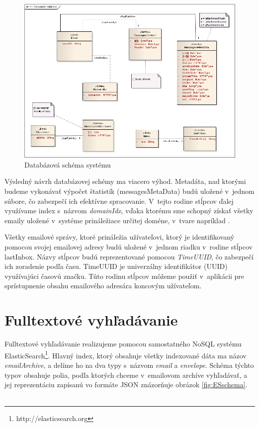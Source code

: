 \documentclass[11pt,twoside,a4paper]{book}
\begin{document}
\begin{figure}[h]
 \centering
 \includegraphics[width=15.3cm]{./figures/cassandra.png}
 \caption{Databázová schéma systému}
 \label{fig:Cschema}
\end{figure}

Výsledný návrh databázovej schémy ma viacero výhod. Metadáta, nad ktorými budeme vykonávať výpočet štatistík (messagesMetaData) budú uložené v~jednom súbore, čo zabezpečí ich efektívne spracovanie. V~tejto rodine stĺpcov ďalej využívame index s~názvom \emph{domainIdx}, vďaka ktorému sme schopný získať všetky emaily uložené v~systéme prináležiace určitej doméne, v~tvare napríklad . 

Všetky emailové správy, ktoré prináležia užívateľovi, ktorý je identifikovaný pomocou svojej emailovej adresy budú uložené v~jednom riadku v~rodine stĺpcov lastInbox. Názvy stĺpcov budú reprezentované pomocou \emph{TimeUUID}, čo zabezpečí ich zoradenie podľa času. TimeUUID je univerzálny identifikátor (UUID) využívajúci časovú značku. Túto rodinu stĺpcov môžeme použiť v~aplikácii pre sprístupnenie obsahu emailového adresára koncovým užívateľom.





\section{Fulltextové vyhľadávanie}

Fulltextové vyhľadávanie realizujeme pomocou samostatného NoSQL systému ElasticSearch\footnote{http://elasticsearch.org}.  Hlavný index, ktorý obsahuje všetky indexované dáta ma názov \emph{emailArchive}, a delíme ho na dva typy s~názvom \emph{email} a \emph{envelope}. Schéma týchto typov obsahuje polia, podľa ktorých chceme v~emailovom archíve vyhľadávať, a jej reprezentáciu zapísanú vo formáte JSON znázorňuje obrázok \ref{fig:ESschema}. \\
\\
\end{document}
